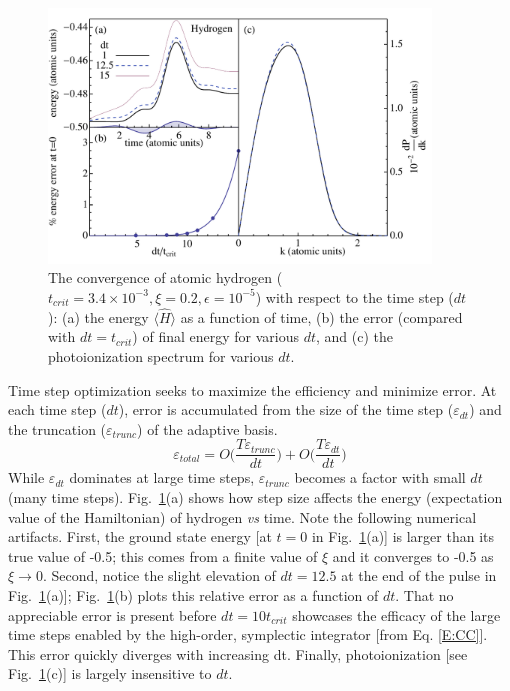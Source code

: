 \documentclass[review,letterpaper]{elsarticle}
\providecommand{\e}[1]{\times 10^{#1}}
\begin{document}
\begin{figure}[tbhp]
\begin{center}
\includegraphics[width=4in]{tSclConv}
\end{center}
\caption{
The convergence of atomic hydrogen
($t_{crit} = 3.4\e{-3}, \xi = 0.2, \epsilon=10^{-5}$) with respect to the time step ($dt$):
(a) the energy $\langle \hat{H} \rangle$ as a function of time,
(b) the error (compared with $dt = t_{crit}$) of final energy for various $dt$, and
(c) the photoionization spectrum for various $dt$.
}
\label{F:tScale}
\end{figure}

Time step optimization seeks to maximize the efficiency and minimize error.
At each time step ($dt$), error is accumulated from the size of the time step
($\varepsilon_{dt}$) and the truncation ($\varepsilon_{trunc}$) of the adaptive basis.
\begin{equation}
\varepsilon_{total} = O\big(\frac{T \varepsilon_{trunc}}{dt}\big)
                    + O\big(\frac{T \varepsilon_{dt}}{dt}\big)
\end{equation}
While $\varepsilon_{dt}$ dominates at large time steps, $\varepsilon_{trunc}$
becomes a factor with small $dt$ (many time steps).
Fig.~\ref{F:tScale}(a) shows how step size affects the
energy (expectation value of the Hamiltonian) of hydrogen \emph{vs} time.
Note the following numerical artifacts. First, the ground state energy
[at $t=0$ in Fig.~\ref{F:tScale}(a)] is larger than its true value of -0.5; this
comes from a finite value of $\xi$ and it converges to -0.5 as $\xi \rightarrow 0$.
Second, notice the slight elevation of $dt=12.5$ at the end of the pulse in Fig.~\ref{F:tScale}(a)];
Fig.~\ref{F:tScale}(b) plots this relative error as a function of $dt$.
That no appreciable error is present before $dt = 10 t_{crit}$ showcases the efficacy of the large time
steps enabled by the high-order, symplectic integrator \cite{Chin:2001vs} [from Eq. \ref{E:CC}].
This error quickly diverges with increasing dt.
Finally, photoionization [see Fig.~\ref{F:tScale}(c)] is largely insensitive to $dt$.
\end{document}
